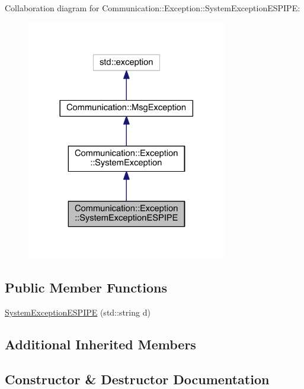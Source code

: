 Collaboration diagram for Communication\+:\+:Exception\+:\+:System\+Exception\+E\+S\+P\+I\+P\+E\+:\nopagebreak
\begin{figure}[H]
\begin{center}
\leavevmode
\includegraphics[width=248pt]{class_communication_1_1_exception_1_1_system_exception_e_s_p_i_p_e__coll__graph}
\end{center}
\end{figure}
\subsection*{Public Member Functions}
\begin{DoxyCompactItemize}
\item 
\hyperlink{class_communication_1_1_exception_1_1_system_exception_e_s_p_i_p_e_aefb13291e25a7a0d0d05f9ecf7078dcb}{System\+Exception\+E\+S\+P\+I\+P\+E} (std\+::string d)
\end{DoxyCompactItemize}
\subsection*{Additional Inherited Members}


\subsection{Constructor \& Destructor Documentation}
\hypertarget{class_communication_1_1_exception_1_1_system_exception_e_s_p_i_p_e_aefb13291e25a7a0d0d05f9ecf7078dcb}{}
